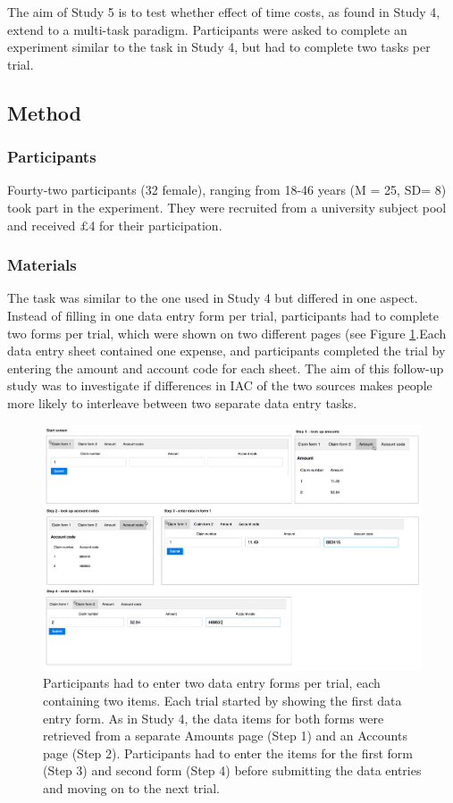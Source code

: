The aim of Study 5 is to test whether effect of time costs, as found in Study 4, extend to a multi-task paradigm. Participants were asked to complete an experiment similar to the task in Study 4, but had to complete two tasks per trial.

\subsection{Method}
\subsubsection{Participants}
Fourty-two participants (32 female), ranging from 18-46 years (M = 25, SD= 8) took part in the experiment. They were recruited from a university subject pool and received $\pounds$4 for their participation.

\subsubsection{Materials}
The task was similar to the one used in Study 4 but differed in one aspect. Instead of filling in one data entry form per trial, participants had to complete two forms per trial, which were shown on two different pages (see Figure \ref{fig:ch34_5-tasklayout}.Each data entry sheet contained one expense, and participants completed the trial by entering the amount and account code for each sheet. The aim of this follow-up study was to investigate if differences in IAC of the two sources makes people more likely to interleave between two separate data entry tasks.

\begin{figure}
\includegraphics[width=\textwidth]{images/ch34/ch34-5_Tasksequence.pdf}
    \caption{Participants had to enter two data entry forms per trial, each containing two items. Each trial started by showing the first data entry form. As in Study 4, the data items for both forms were retrieved from a separate Amounts page (Step 1) and an Accounts page (Step 2). Participants had to enter the items for the first form (Step 3) and second form (Step 4) before submitting the data entries and moving on to the next trial.}\label{fig:ch34_5-tasklayout}
\end{figure}

